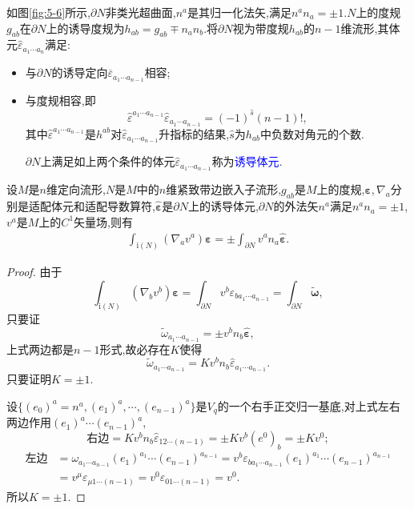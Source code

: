 如图\ref{fig:5-6}所示,$\partial N$非类光超曲面,$n^a$是其归一化法矢,满足$n^an_a=\pm 1.N$上的度规$g_{ab}$在$\partial N$上的诱导度规为$h_{ab}=g_{ab}\mp n_an_b .$将$\partial N$视为带度规$h_{ab}$的$n-1$维流形,其体元$\hat{\varepsilon}_{a_1\cdots a_n}$满足:
\begin{itemize}
    \item 与$\partial N$的诱导定向$\overline{\varepsilon}_{a_1\cdots a_{n-1}}$相容;
    \item 与度规相容,即$$\hat{\varepsilon}^{a_1\cdots a_{n-1}}\hat{\varepsilon}_{a_1\cdots a_{n-1}}=(-1)^{\hat{s}}(n-1)!,$$
    其中$\hat{\varepsilon}^{a_1\cdots a_{n-1}}$是$h^{ab}$对$\hat{\varepsilon}_{a_1\cdots a_{n-1}}$升指标的结果,$\hat{s}$为$h_{ab}$中负数对角元的个数.
    
    $\partial N$上满足如上两个条件的体元$\hat{\varepsilon}_{a_1\cdots a_{n-1}}$称为\textcolor{blue}{诱导体元}.
\end{itemize}

设$M$是$n$维定向流形,$N$是$M$中的$n$维紧致带边嵌入子流形,$g_{ab}$是$M$上的度规,$\boldsymbol{\varepsilon},\nabla_a$分别是适配体元和适配导数算符,$\hat{\boldsymbol{\varepsilon}}$是$\partial N$上的诱导体元,$\partial N$的外法矢$n^a$满足$n^an_a=\pm 1$,$v^a$是$M$上的$C^1$矢量场,则有
\begin{align}
    \boxed{\int_{\text{i}(N)}(\nabla_av^a)\boldsymbol{\varepsilon}=\pm \int_{\partial N}v^an_a\hat{\boldsymbol{\varepsilon}}.}
\end{align}
\begin{proof}
    由于$$
    \int_{\text{i}(N)}(\nabla_bv^b)\boldsymbol{\varepsilon}=\int_{\partial N}v^b\varepsilon_{ba_1\cdots a_{n-1}}=\int_{\partial N}\tilde{\boldsymbol{\omega}},
    $$
    只要证$$\tilde{\omega}_{a_1\cdots a_{n-1}}=\pm v^bn_b
   \hat{\boldsymbol{\varepsilon}},
    $$
    上式两边都是$n-1$形式,故必存在$K$使得
    $$
    \tilde{\omega}_{a_1\cdots a_{n-1}}=K v^bn_b
   \hat{\varepsilon}_{a_1\cdots a_{n-1}}.
    $$
只要证明$K=\pm 1.$
    
设$\{(e_0)^a=n^a,(e_1)^a,\cdots,(e_{n-1})^a\}$是$V_q$的一个右手正交归一基底,对上式左右两边作用$(e_1)^a\cdots (e_{n-1})^a$,
    $$
    \text{右边}=Kv^bn_b\hat{\varepsilon}_{12\cdots (n-1)}=\pm Kv^b(e^0)_b=\pm Kv^0;
 $$
 $$
    \begin{aligned}
        \text{左边} &=\omega_{a_1\cdots a_{n-1}}(e_1)^{a_1}\cdots (e_{n-1})^{a_{n-1}}=v^b\varepsilon_{ba_1\cdots a_{n-1}}(e_1)^{a_1}\cdots (e_{n-1})^{a_{n-1}}\\
    &=v^\mu\varepsilon_{\mu 1\cdots (n-1)}=v^0\varepsilon_{01\cdots(n-1)}=v^0.
    \end{aligned}
    $$
    所以$K=\pm 1.$
\end{proof}


